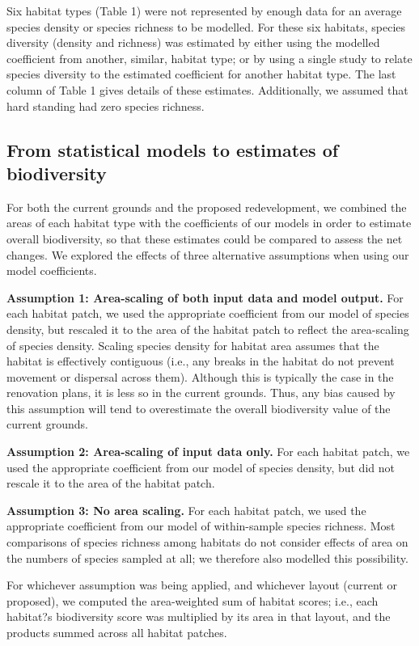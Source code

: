 Six habitat types (Table 1) were not represented by enough data for an average species density or species richness to be modelled. For these six habitats, species diversity (density and richness) was estimated by either using the modelled coefficient from another, similar, habitat type; or by using a single study to relate species diversity to the estimated coefficient for another habitat type.  The last column of Table 1 gives details of these estimates. Additionally, we assumed that hard standing had zero species richness.

\subsection{From statistical models to estimates of biodiversity}
For both the current grounds and the proposed redevelopment, we combined the areas of each habitat type with the coefficients of our models in order to estimate overall biodiversity, so that these estimates could be compared to assess the net changes. We explored the effects of three alternative assumptions when using our model coefficients.

\textbf{Assumption 1: Area-scaling of both input data and model output.} For each habitat patch, we used the appropriate coefficient from our model of species density, but rescaled it to the area of the habitat patch to reflect the area-scaling of species density. Scaling species density for habitat area assumes that the habitat is effectively contiguous (i.e., any breaks in the habitat do not prevent movement or dispersal across them). Although this is typically the case in the renovation plans, it is less so in the current grounds. Thus, any bias caused by this assumption will tend to overestimate the overall biodiversity value of the current grounds.

\textbf{Assumption 2: Area-scaling of input data only.} For each habitat patch, we used the appropriate coefficient from our model of species density, but did not rescale it to the area of the habitat patch. 

\textbf{Assumption 3: No area scaling.} For each habitat patch, we used the appropriate coefficient from our model of within-sample species richness. Most comparisons of species richness among habitats do not consider effects of area on the numbers of species sampled at all; we therefore also modelled this possibility.

For whichever assumption was being applied, and whichever layout (current or proposed), we computed the area-weighted sum of habitat scores; i.e., each habitat?s biodiversity score was multiplied by its area in that layout, and the products summed across all habitat patches.

